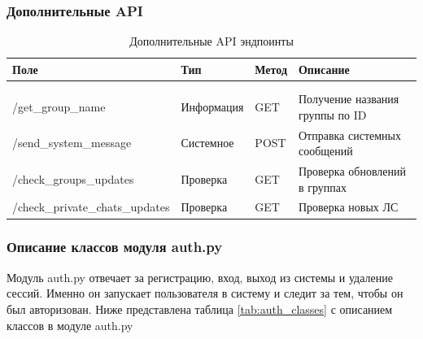 \subsubsection{Дополнительные API}

\begin{xltabular}{\textwidth}{|l|l|p{1.7cm}|X|}
	\caption{Дополнительные API эндпоинты}\label{tab:additional_api} \\ \hline
	\centrow Поле & \centrow Тип & \centrow Метод & \centrow Описание \\ \hline
	 &  &  &  \\ \hline
	\endfirsthead
	 &  &  &  \\ \hline
	\finishhead
	/get\_group\_name & Информация & GET & Получение названия группы по ID \\ \hline 
	/send\_system\_message & Системное & POST & Отправка системных сообщений \\ \hline 
	/check\_groups\_updates & Проверка & GET & Проверка обновлений в группах \\ \hline 
	/check\_private\_chats\_updates & Проверка & GET & Проверка новых ЛС \\ \hline 
\end{xltabular}

\subsubsection{Описание классов модуля auth.py}

Модуль auth.py отвечает за регистрацию, вход, выход из системы и удаление сессий. Именно он запускает пользователя в систему и следит за тем, чтобы он был авторизован. Ниже представлена таблица \ref{tab:auth_classes} с описанием классов в модуле auth.py 


